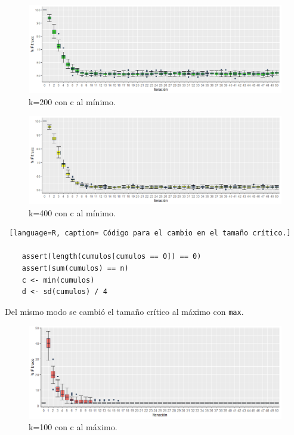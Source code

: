 \documentclass{article}
\begin{document}
\newpage

\begin{figure} [h!]%
\renewcommand{\figurename}{Gráfica}
    \centering
    \caption{ k=200 con c al mínimo.}
    \label{grafica7}
    \includegraphics[width=170mm]{grafica7.png} %
\end{figure}

\begin{figure} [h!]%
\renewcommand{\figurename}{Gráfica}
    \centering
    \caption{ k=400 con c al mínimo.}
    \label{grafica8}
    \includegraphics[width=170mm]{grafica8.png} %
\end{figure}

\begin{lstlisting} [language=R, caption= Código para el cambio en el tamaño crítico.]

    assert(length(cumulos[cumulos == 0]) == 0) 
    assert(sum(cumulos) == n)
    c <- min(cumulos) 
    d <- sd(cumulos) / 4 

\end{lstlisting}

Del mismo modo se cambió el tamaño crítico al máximo con \texttt{max}.
\newpage

\begin{figure} [h!]%
\renewcommand{\figurename}{Gráfica}
    \centering
    \caption{ k=100 con c al máximo.}
    \label{grafica9}
    \includegraphics[width=170mm]{grafica9.png} %
\end{figure}
\end{document}
